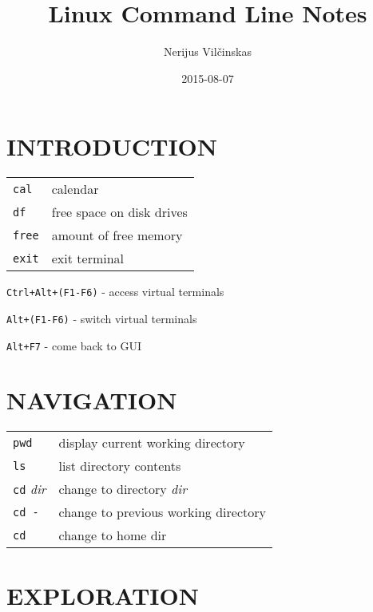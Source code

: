 \documentclass[8pt]{extarticle}
\begin{document}
\title{Linux Command Line Notes}
\author{Nerijus Vilčinskas}
\date{2015-08-07}
\maketitle

\begin{multicols}{2}

\section{INTRODUCTION}

\begin{tabular}{ll}
	\texttt{cal} & calendar \\
	\texttt{df} & free space on disk drives \\
	\texttt{free} & amount of free memory \\
	\texttt{exit} & exit terminal \\
\end{tabular}

\texttt{Ctrl+Alt+(F1-F6)} - access virtual terminals

\texttt{Alt+(F1-F6)} - switch virtual terminals

\texttt{Alt+F7} - come back to GUI

\section{NAVIGATION}

\begin{tabular}{ll}
\texttt{pwd} & display current working directory\\
\texttt{ls} & list directory contents\\
\texttt{cd} \textit{dir} & change to directory \textit{dir} \\
\texttt{cd -} & change to previous working directory\\
\texttt{cd} & change to home dir
\end{tabular}


\section{EXPLORATION}


\end{multicols}
\end{document}
